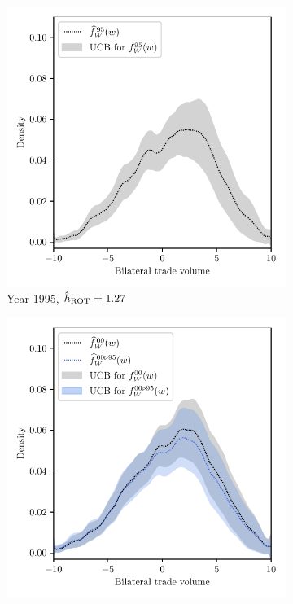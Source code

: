 \begin{figure}[ht]
  \centering
  \begin{subfigure}{0.32\textwidth}
    \centering
    \includegraphics[scale=0.48]{graphics/trade_plot_1995.pdf}
    \caption{Year 1995, $\hat h_{\operatorname{ROT}} = 1.27$}
  \end{subfigure}
  \begin{subfigure}{0.32\textwidth}
    \centering
    \includegraphics[scale=0.48]{graphics/trade_plot_1995_2000.pdf}

\end{subfigure}
\end{figure}
